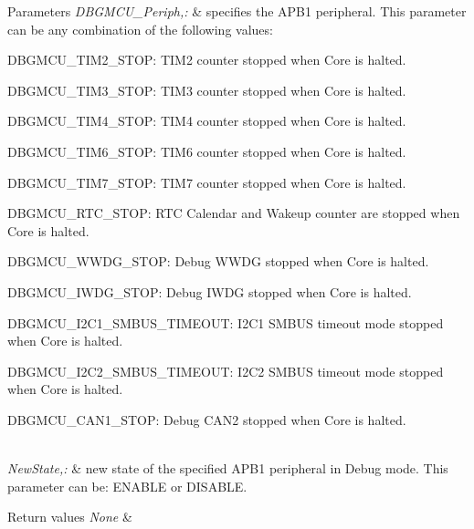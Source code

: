 \begin{DoxyParams}{Parameters}
{\em D\-B\-G\-M\-C\-U\-\_\-\-Periph,\-:} & specifies the A\-P\-B1 peripheral. This parameter can be any combination of the following values\-: \begin{DoxyItemize}
\item D\-B\-G\-M\-C\-U\-\_\-\-T\-I\-M2\-\_\-\-S\-T\-O\-P\-: T\-I\-M2 counter stopped when Core is halted. \item D\-B\-G\-M\-C\-U\-\_\-\-T\-I\-M3\-\_\-\-S\-T\-O\-P\-: T\-I\-M3 counter stopped when Core is halted. \item D\-B\-G\-M\-C\-U\-\_\-\-T\-I\-M4\-\_\-\-S\-T\-O\-P\-: T\-I\-M4 counter stopped when Core is halted. \item D\-B\-G\-M\-C\-U\-\_\-\-T\-I\-M6\-\_\-\-S\-T\-O\-P\-: T\-I\-M6 counter stopped when Core is halted. \item D\-B\-G\-M\-C\-U\-\_\-\-T\-I\-M7\-\_\-\-S\-T\-O\-P\-: T\-I\-M7 counter stopped when Core is halted. \item D\-B\-G\-M\-C\-U\-\_\-\-R\-T\-C\-\_\-\-S\-T\-O\-P\-: R\-T\-C Calendar and Wakeup counter are stopped when Core is halted. \item D\-B\-G\-M\-C\-U\-\_\-\-W\-W\-D\-G\-\_\-\-S\-T\-O\-P\-: Debug W\-W\-D\-G stopped when Core is halted. \item D\-B\-G\-M\-C\-U\-\_\-\-I\-W\-D\-G\-\_\-\-S\-T\-O\-P\-: Debug I\-W\-D\-G stopped when Core is halted. \item D\-B\-G\-M\-C\-U\-\_\-\-I2\-C1\-\_\-\-S\-M\-B\-U\-S\-\_\-\-T\-I\-M\-E\-O\-U\-T\-: I2\-C1 S\-M\-B\-U\-S timeout mode stopped when Core is halted. \item D\-B\-G\-M\-C\-U\-\_\-\-I2\-C2\-\_\-\-S\-M\-B\-U\-S\-\_\-\-T\-I\-M\-E\-O\-U\-T\-: I2\-C2 S\-M\-B\-U\-S timeout mode stopped when Core is halted. \item D\-B\-G\-M\-C\-U\-\_\-\-C\-A\-N1\-\_\-\-S\-T\-O\-P\-: Debug C\-A\-N2 stopped when Core is halted. \end{DoxyItemize}
\\
\hline
{\em New\-State,\-:} & new state of the specified A\-P\-B1 peripheral in Debug mode. This parameter can be\-: E\-N\-A\-B\-L\-E or D\-I\-S\-A\-B\-L\-E. \\
\hline
\end{DoxyParams}

\begin{DoxyRetVals}{Return values}
{\em None} & \\
\hline
\end{DoxyRetVals}



